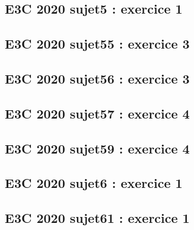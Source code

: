 \documentclass[lang=fr,edition=teacher,layout=sheet]{mxbook}
\begin{document}
\begingroup\endgroup
\par\bigskip
{}\subsection*{E3C 2020 sujet5 : exercice 1}
\begingroup\endgroup
\par\bigskip
{}\subsection*{E3C 2020 sujet55 : exercice 3}
\begingroup\endgroup
\par\bigskip
{}\subsection*{E3C 2020 sujet56 : exercice 3}
\begingroup\endgroup
\par\bigskip
{}\subsection*{E3C 2020 sujet57 : exercice 4}
\begingroup\endgroup
\par\bigskip
{}\subsection*{E3C 2020 sujet59 : exercice 4}
\begingroup\endgroup
\par\bigskip
{}\subsection*{E3C 2020 sujet6 : exercice 1}
\begingroup\endgroup
\par\bigskip
{}\subsection*{E3C 2020 sujet61 : exercice 1}
\begingroup\endgroup
\end{document}

